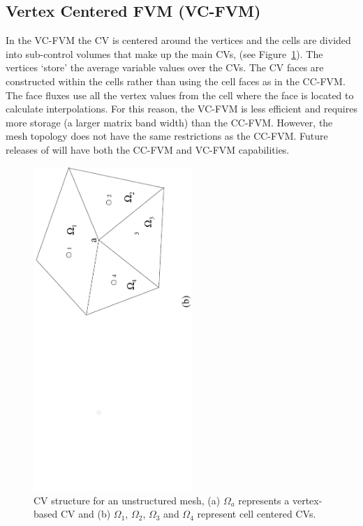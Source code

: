 \subsection{Vertex Centered FVM (VC-FVM)}

In the VC-FVM the CV is centered around the vertices and the cells are
divided into sub-control volumes that make up the main CVs, (see
Figure~\ref{fig:vc-cc-fv}).  The vertices `store' the average variable
values over the CVs.  The CV faces are constructed within the cells
rather than using the cell faces as in the CC-FVM. The face fluxes use
all the vertex values from the cell where the face is located to
calculate interpolations.  For this reason, the VC-FVM is less
efficient and requires more storage (a larger matrix band width) than
the CC-FVM. However, the mesh topology does not have the same
restrictions as the CC-FVM. Future releases of \FiPy{} will have both
the CC-FVM and VC-FVM capabilities.

\begin{figure}
\begin{center}
 \includegraphics[width=6cm,angle=-90]{numerical/vc-cc-fv.pdf}
 \caption{CV structure for an unstructured mesh, (a) $\Omega_a$
 represents a vertex-based CV and (b) $\Omega_1$, $\Omega_2$,
 $\Omega_3$ and $\Omega_4$ represent cell centered CVs. }
 \label{fig:vc-cc-fv}
\end{center}
\end{figure}

